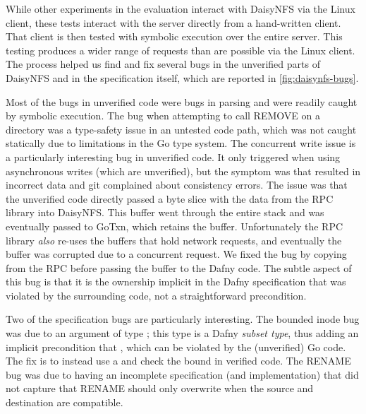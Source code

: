 While other experiments in the evaluation interact with DaisyNFS via the Linux
client, these tests interact with the server directly from a hand-written
client. That client is then tested with symbolic execution over the entire server.
This testing produces a wider range of requests than are possible via the Linux
client. The process helped us find and fix several bugs in the unverified parts
of DaisyNFS and in the specification itself, which are reported in
\cref{fig:daisynfs-bugs}.

Most of the bugs in unverified code were bugs in parsing and were readily caught
by symbolic execution. The bug when attempting to call REMOVE on a directory was
a type-safety issue in an untested code path, which was not caught statically
due to limitations in the Go type system. The concurrent write issue is
a particularly interesting bug in unverified code. It only triggered when using
asynchronous writes (which are unverified), but the symptom was that  resulted in incorrect data and git complained about consistency errors.
The issue was that the unverified code directly passed a byte slice with the
 data from the RPC library into DaisyNFS. This buffer went through the
entire stack and was eventually passed to GoTxn, which retains the buffer.
Unfortunately the RPC library \emph{also} re-uses the buffers that hold network
requests, and eventually the buffer was corrupted due to a concurrent request.
We fixed the bug by copying from the RPC before passing the buffer to the Dafny
code. The subtle aspect of this bug is that it is the ownership implicit in the
Dafny specification that was violated by the surrounding code, not a
straightforward precondition.

Two of the specification bugs are particularly interesting. The bounded inode bug
was due to an  argument of type ; this type is a Dafny
\emph{subset type}, thus adding an implicit precondition that , which can be violated by the (unverified) Go code. The fix is to instead
use a  and check the bound in verified code. The RENAME bug was due
to having an incomplete specification (and implementation) that did not capture
that RENAME should only overwrite when the source and destination are
compatible.

